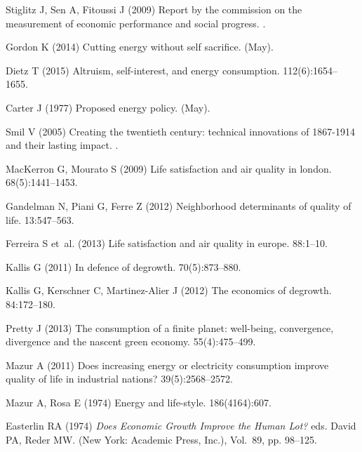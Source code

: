 \documentclass[10pt, letterpaper]{article}
\begin{document}
\begin{spacing}{1.4}
\begin{thebibliography}{10}
Stiglitz J, Sen A, Fitoussi J (2009) Report by the commission on the
  measurement of economic performance and social progress.
.

Gordon K (2014) Cutting energy without self sacrifice.
 (May).

Dietz T (2015) Altruism, self-interest, and energy consumption.
  112(6):1654--1655.

Carter J (1977) Proposed energy policy.
 (May).

Smil V (2005) Creating the twentieth century: technical innovations of
  1867-1914 and their lasting impact.
.

MacKerron G, Mourato S (2009) Life satisfaction and air quality in london.
 68(5):1441--1453.

Gandelman N, Piani G, Ferre Z (2012) Neighborhood determinants of quality of
  life.
 13:547--563.

Ferreira S et~al. (2013) Life satisfaction and air quality in europe.
 88:1--10.

Kallis G (2011) In defence of degrowth.
 70(5):873--880.

Kallis G, Kerschner C, Martinez-Alier J (2012) The economics of degrowth.
 84:172--180.

Pretty J (2013) The consumption of a finite planet: well-being, convergence,
  divergence and the nascent green economy.
 55(4):475--499.

Mazur A (2011) Does increasing energy or electricity consumption improve
  quality of life in industrial nations?
 39(5):2568--2572.

Mazur A, Rosa E (1974) Energy and life-style.
 186(4164):607.

Easterlin RA (1974) {\em Does Economic Growth Improve the Human Lot?} eds.{}
  David PA, Reder MW.
\newblock (New York: Academic Press, Inc.), Vol.{}~89, pp. 98--125.


\end{thebibliography}
\end{spacing}
\end{document}
